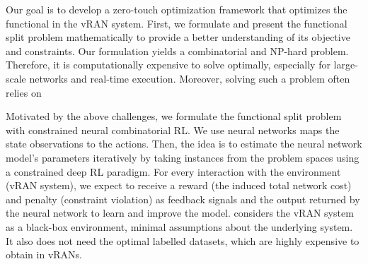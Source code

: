 Our goal is to develop a zero-touch optimization framework that optimizes the functional    in the vRAN system. First, we formulate and present the functional split problem mathematically to provide a better understanding of its objective and constraints. Our formulation yields a combinatorial and NP-hard problem. Therefore, it is computationally expensive to solve optimally, especially for large-scale networks and real-time execution. Moreover, solving such a problem often relies on    
 
Motivated by the above challenges, we formulate the functional split problem with {constrained neural combinatorial RL}. We use neural networks  maps the state observations to the actions. Then, the idea is to estimate the neural network model's parameters iteratively by taking instances from the problem spaces using a constrained deep RL paradigm. For every interaction with the environment (vRAN system), we expect to receive a reward (the induced total network cost) and penalty (constraint violation) as feedback signals and the output returned by the neural network to learn and improve the model.  considers the vRAN system as a black-box environment,  minimal assumptions about the underlying system. It also does not need the optimal labelled datasets, which are highly expensive to obtain in vRANs. 
 

